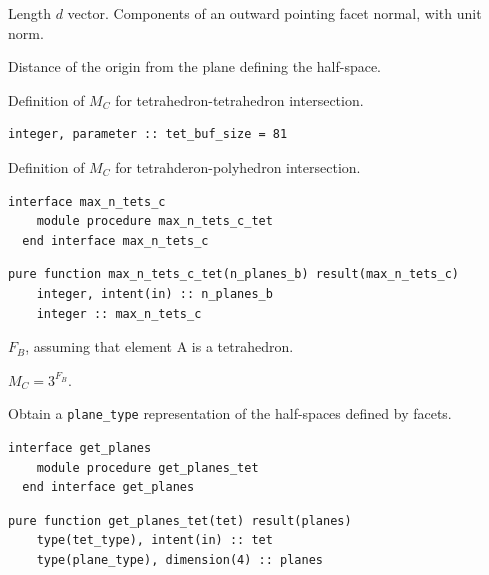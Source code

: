 \documentclass{article}
\begin{document}
\begin{description}[font=\ttfamily\bfseries,leftmargin=2.2\parindent,labelindent=1.7\parindent,noitemsep]
  \item[normal] Length $d$ vector. Components of an outward pointing facet
    normal, with unit norm.
  \item[c] Distance of the origin from the plane defining the half-space.
\end{description}

\noindent Definition of $M_C$ for tetrahedron-tetrahedron intersection.

\begin{lstlisting}[language=FORTRAN]
  integer, parameter :: tet_buf_size = 81
\end{lstlisting}

\noindent Definition of $M_C$ for tetrahderon-polyhedron intersection.

\begin{lstlisting}[language=FORTRAN]
  interface max_n_tets_c
    module procedure max_n_tets_c_tet
  end interface max_n_tets_c
\end{lstlisting}

\begin{lstlisting}[language=FORTRAN]
  pure function max_n_tets_c_tet(n_planes_b) result(max_n_tets_c)
    integer, intent(in) :: n_planes_b    
    integer :: max_n_tets_c
\end{lstlisting}

\begin{description}[font=\ttfamily\bfseries,leftmargin=2.2\parindent,labelindent=1.7\parindent,noitemsep]
  \item[n\_planes\_b] $F_B$, assuming that element A is a tetrahedron.
  \item[max\_n\_tets\_c] $M_C = 3^{F_B}$.
\end{description}

\noindent Obtain a \verb+plane_type+ representation of the half-spaces defined
by facets.

\begin{lstlisting}[language=FORTRAN]
  interface get_planes
    module procedure get_planes_tet
  end interface get_planes
\end{lstlisting}
  
\begin{lstlisting}[language=FORTRAN]
  pure function get_planes_tet(tet) result(planes)
    type(tet_type), intent(in) :: tet
    type(plane_type), dimension(4) :: planes
\end{lstlisting}
\end{document}
